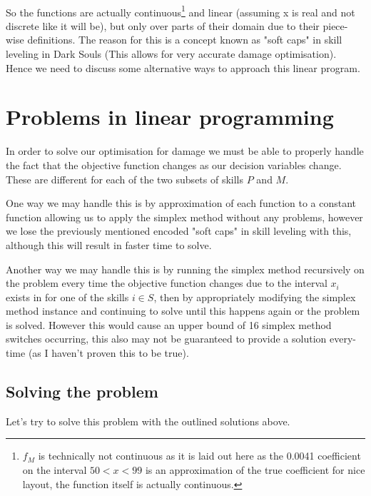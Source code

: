 \documentclass{article}
\begin{document}
\paragraph{}So the functions are actually continuous\footnote{$f_M$ is technically not continuous as it is laid out here as the 0.0041 coefficient on the interval $50 < x < 99$ is an approximation of the true coefficient for nice layout, the function itself is actually continuous.} and linear (assuming x is real and not discrete like it will be), but only over parts of their domain due to their piece-wise definitions. The reason for this is a concept known as "soft caps" in skill leveling in Dark Souls (This allows for very accurate damage optimisation). Hence we need to discuss some alternative ways to approach this linear program.
\section{Problems in linear programming}
\par In order to solve our optimisation for damage we must be able to properly handle the fact that the objective function changes as our decision variables change. These are different for each of the two subsets of skills $P$ and $M$.
\par One way we may handle this is by approximation of each function to a constant function allowing us to apply the simplex method without any problems, however we lose the previously mentioned encoded "soft caps" in skill leveling with this, although this will result in faster time to solve.
\par Another way we may handle this is by running the simplex method recursively on the problem every time the objective function changes due to the interval $x_i$ exists in for one of the skills $i \in S$, then by appropriately modifying the simplex method instance and continuing to solve until this happens again or the problem is solved. However this would cause an upper bound of 16 simplex method switches occurring, this also may not be guaranteed to provide a solution every-time (as I haven't proven this to be true).
\subsection{Solving the problem}
\par Let's try to solve this problem with the outlined solutions above.
\end{document}
